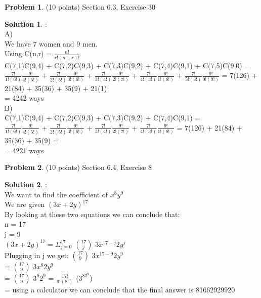 \documentclass{article}
\theoremstyle{definition}
\newtheorem{problem}{Problem}
\newtheorem*{solution}{Solution}
\begin{document}
\begin{problem} (10 points) Section 6.3, Exercise 30
\end{problem}
\begin{solution}:
\\
A)
\\
We have 7 women and 9 men. 
\\
Using C(n,r) = $\frac{n!}{r!(n-r)!}$
\\
C(7,1)C(9,4) + C(7,2)C(9,3) + C(7,3)C(9,2) + C(7,4)C(9,1) + C(7,5)C(9,0) =
\\
$\frac{7!}{1!(6!)}$$\frac{9!}{4!(5!)}$ + $\frac{7!}{2!(5!)}$$\frac{9!}{3!(6!)}$ + $\frac{7!}{3!(4!)}$$\frac{9!}{2!(7!)}$ + $\frac{7!}{4!(3!)}$$\frac{9!}{1!(8!)}$ + $\frac{7!}{5!(3!)}$$\frac{9!}{0!(9!)}$ = 7(126) + 21(84) + 35(36) + 35(9) + 21(1)
\\
= 4242 ways
\\

B)
\\
C(7,1)C(9,4) + C(7,2)C(9,3) + C(7,3)C(9,2) + C(7,4)C(9,1) =
\\
$\frac{7!}{1!(6!)}$$\frac{9!}{4!(5!)}$ + $\frac{7!}{2!(5!)}$$\frac{9!}{3!(6!)}$ + $\frac{7!}{3!(4!)}$$\frac{9!}{2!(7!)}$ + $\frac{7!}{4!(3!)}$$\frac{9!}{1!(8!)}$ = 7(126) + 21(84) + 35(36) + 35(9) = 
\\
= 4221 ways
\end{solution}

\newpage

\begin{problem} (10 points) Section 6.4, Exercise 8
\end{problem}
\begin{solution}:
\\
We want to find the coefficient of $x^8y^9$
\\
We are given $(3x+2y)^{17}$
\\
By looking at these two equations we can conclude that:
\\
n = 17
\\
j = 9
\\
$(3x+2y)^{17} = \Sigma_{j=0}^{17}$ $ {17}\choose{j} $ $3x^{17-j}2y^j$
\\
Plugging in j we get:
${17}\choose{9} $ $3x^{17-9}2y^9$
\\
= ${17}\choose{9} $ $3x^{8}2y^9$ 
\\
= ${17}\choose{9} $ $3^{8}2^9$ = $\frac{17!}{9!(8!)}$ ($3^82^9$)
\\
= using a calculator we can conclude that the final answer is 81662929920
\end{solution}
\end{document}
